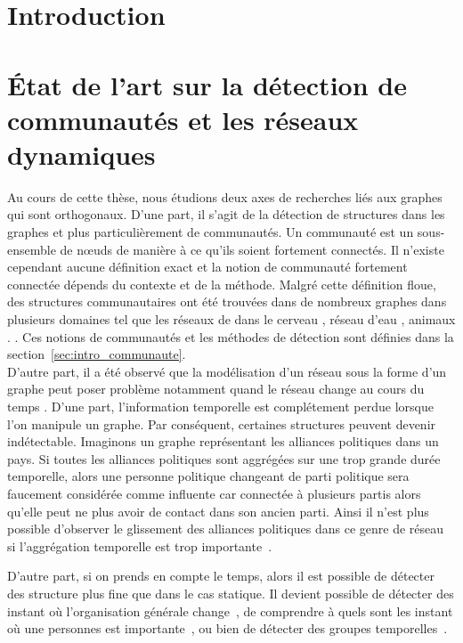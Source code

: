 
\chapter*{Introduction}

\chapter{État de l'art sur la détection de communautés et les réseaux dynamiques}
\minitoc
Au cours de cette thèse, nous étudions deux axes de recherches liés aux graphes qui sont orthogonaux.
D'une part, il s'agit de la détection de structures dans les graphes et plus particulièrement de communautés.
Un communauté est un sous-ensemble de n\oe uds de manière à ce qu'ils soient fortement connectés.
Il n'existe cependant aucune définition exact et la notion de communauté fortement connectée dépends du contexte et de la méthode.
Malgré cette définition floue, des structures communautaires ont été trouvées dans de nombreux graphes dans plusieurs domaines tel que les réseaux de dans le cerveau \cite{DeReus2014}, réseau d'eau \cite{DiNardo2015} , animaux \cite{Farine2015}\REF . \REF.
Ces notions de communautés et les méthodes de détection sont définies dans la section~\ref{sec:intro_communaute}.\\

D'autre part, il a été observé que la modélisation d'un réseau sous la forme d'un graphe peut poser problème notamment quand le réseau change au cours du temps \cite{Holme2015b}.
D'une part, l'information temporelle est complétement perdue lorsque l'on manipule un graphe.
Par conséquent, certaines structures peuvent devenir indétectable.
Imaginons un graphe représentant les alliances politiques dans un pays.
Si toutes les alliances politiques sont aggrégées sur une trop grande durée temporelle, alors une personne politique changeant de parti politique sera faucement considérée comme influente car connectée à plusieurs partis alors qu'elle peut ne plus avoir de contact dans son ancien parti.
Ainsi il n'est plus possible d'observer le glissement des alliances politiques dans ce genre de réseau si l'aggrégation temporelle est trop importante~\cite{Mucha2010}.

D'autre part, si on prends en compte le temps, alors il est possible de détecter des structure plus fine que dans le cas statique.
Il devient possible de détecter des instant où l'organisation générale change~\cite{Rosvall2010}, de comprendre à quels sont les instant où une personnes est importante~\cite{Magnien2015}, ou bien de détecter des groupes temporelles~\cite{Cazabet2010}. 

